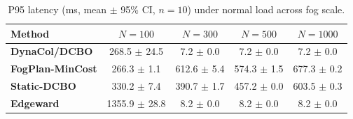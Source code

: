 \begin{table}[!t]
\centering
\caption{P95 latency (ms, mean $\pm$ 95\% CI, $n=10$) under normal load across fog scale.}
\label{tab:p95_all}
\fgcsTableCol
\begin{tabular*}{\columnwidth}{@{\extracolsep{\fill}}lcccc@{}}
\toprule
\textbf{Method} & \textbf{$N=100$} & \textbf{$N=300$} & \textbf{$N=500$} & \textbf{$N=1000$} \\
\midrule
\textcolor{dynacolBlue}{\textbf{DynaCol/DCBO}} & 268.5 $\pm$ 24.5 & 7.2 $\pm$ 0.0 & 7.2 $\pm$ 0.0 & 7.2 $\pm$ 0.0 \\
\textcolor{dynacolOrange}{\textbf{FogPlan-MinCost}} & 266.3 $\pm$ 1.1 & 612.6 $\pm$ 5.4 & 574.3 $\pm$ 1.5 & 677.3 $\pm$ 0.2 \\
\textcolor{dynacolTeal}{\textbf{Static-DCBO}} & 330.2 $\pm$ 7.4 & 390.7 $\pm$ 1.7 & 457.2 $\pm$ 0.0 & 603.5 $\pm$ 0.3 \\
\textcolor{dynacolPurple}{\textbf{Edgeward}} & 1355.9 $\pm$ 28.8 & 8.2 $\pm$ 0.0 & 8.2 $\pm$ 0.0 & 8.2 $\pm$ 0.0 \\
\bottomrule
\end{tabular*}
\end{table}
